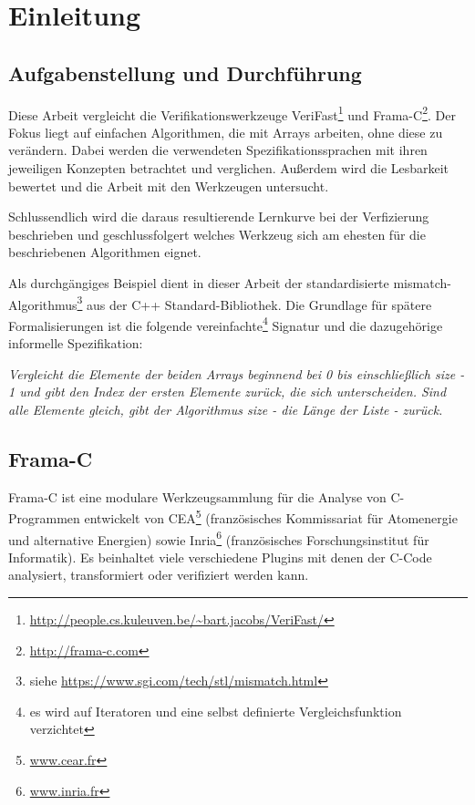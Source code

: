 ﻿\chapter{Einleitung}

\section{Aufgabenstellung und Durchführung}
\label{sec:aufgabenstellung}
Diese Arbeit vergleicht die Verifikationswerkzeuge VeriFast\footnote{
\url{http://people.cs.kuleuven.be/~bart.jacobs/VeriFast/}} und Frama-C\footnote{\url{http://frama-c.com}}.
Der Fokus liegt auf einfachen Algorithmen, die mit Arrays arbeiten, ohne diese zu verändern.
Dabei werden die verwendeten Spezifikationssprachen mit ihren jeweiligen Konzepten betrachtet und verglichen. Außerdem
wird die Lesbarkeit bewertet und die Arbeit mit den Werkzeugen untersucht. 

Schlussendlich wird die daraus resultierende Lernkurve bei der Verfizierung beschrieben und geschlussfolgert
welches Werkzeug sich am ehesten für die beschriebenen Algorithmen eignet.

Als durchgängiges Beispiel dient in dieser Arbeit der standardisierte mismatch-Algorithmus\footnote{siehe
\url{https://www.sgi.com/tech/stl/mismatch.html}} aus
der C++ Standard-Bibliothek. Die Grundlage für spätere Formalisierungen ist die folgende vereinfachte\footnote{es
wird auf Iteratoren und eine selbst definierte Vergleichsfunktion verzichtet} Signatur und 
die dazugehörige informelle Spezifikation:

\lstset{frame=none}    

\lstset{frame=single}

\noindent \emph{Vergleicht die Elemente der beiden Arrays beginnend bei 0 bis einschließlich size - 1 und gibt den
Index der ersten Elemente zurück, die sich unterscheiden. Sind alle Elemente gleich, gibt der Algorithmus
size - die Länge der Liste - zurück.}


\section{Frama-C}
\label{acsl-und-frama-c}

Frama-C ist eine modulare Werkzeugsammlung für die Analyse von C-Programmen entwickelt von CEA\footnote{\url{www.cear.fr}}
(französisches Kommissariat für Atomenergie und alternative Energien) sowie Inria\footnote{\url{www.inria.fr}} 
(französisches Forschungsinstitut für Informatik). Es beinhaltet viele verschiedene Plugins mit denen der C-Code
analysiert, transformiert oder verifiziert werden kann. 

